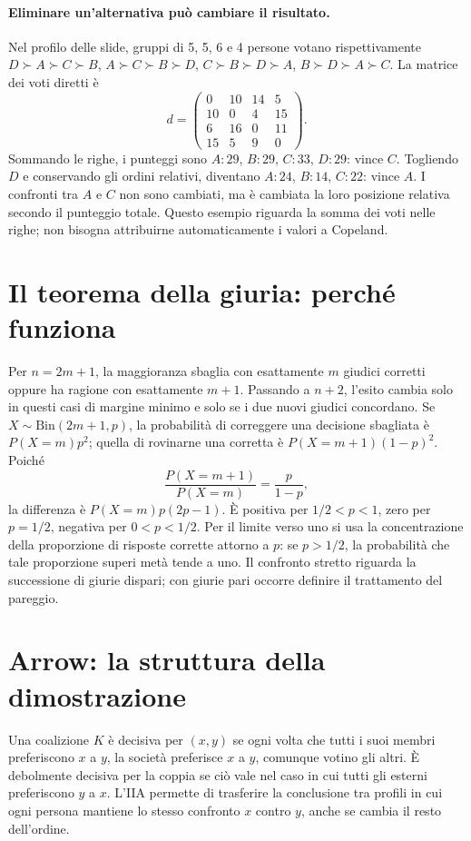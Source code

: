 \paragraph{Eliminare un'alternativa può cambiare il risultato.} Nel profilo delle slide, gruppi di 5, 5, 6 e 4 persone votano rispettivamente $D\succ A\succ C\succ B$, $A\succ C\succ B\succ D$, $C\succ B\succ D\succ A$, $B\succ D\succ A\succ C$. La matrice dei voti diretti è
\[ d=\begin{pmatrix}0&10&14&5\\10&0&4&15\\6&16&0&11\\15&5&9&0\end{pmatrix}. \]
Sommando le righe, i punteggi sono $A:29$, $B:29$, $C:33$, $D:29$: vince $C$. Togliendo $D$ e conservando gli ordini relativi, diventano $A:24$, $B:14$, $C:22$: vince $A$. I confronti tra $A$ e $C$ non sono cambiati, ma è cambiata la loro posizione relativa secondo il punteggio totale. Questo esempio riguarda la somma dei voti nelle righe; non bisogna attribuirne automaticamente i valori a Copeland.

\section{Il teorema della giuria: perché funziona}
Per $n=2m+1$, la maggioranza sbaglia con esattamente $m$ giudici corretti oppure ha ragione con esattamente $m+1$. Passando a $n+2$, l'esito cambia solo in questi casi di margine minimo e solo se i due nuovi giudici concordano. Se $X\sim\mathrm{Bin}(2m+1,p)$, la probabilità di correggere una decisione sbagliata è $P(X=m)p^2$; quella di rovinarne una corretta è $P(X=m+1)(1-p)^2$. Poiché
\[\frac{P(X=m+1)}{P(X=m)}=\frac{p}{1-p},\]
la differenza è $P(X=m)p(2p-1)$. È positiva per $1/2<p<1$, zero per $p=1/2$, negativa per $0<p<1/2$. Per il limite verso uno si usa la concentrazione della proporzione di risposte corrette attorno a $p$: se $p>1/2$, la probabilità che tale proporzione superi metà tende a uno. Il confronto stretto riguarda la successione di giurie dispari; con giurie pari occorre definire il trattamento del pareggio.

\section{Arrow: la struttura della dimostrazione}
Una coalizione $K$ è decisiva per $(x,y)$ se ogni volta che tutti i suoi membri preferiscono $x$ a $y$, la società preferisce $x$ a $y$, comunque votino gli altri. È debolmente decisiva per la coppia se ciò vale nel caso in cui tutti gli esterni preferiscono $y$ a $x$. L'IIA permette di trasferire la conclusione tra profili in cui ogni persona mantiene lo stesso confronto $x$ contro $y$, anche se cambia il resto dell'ordine.

